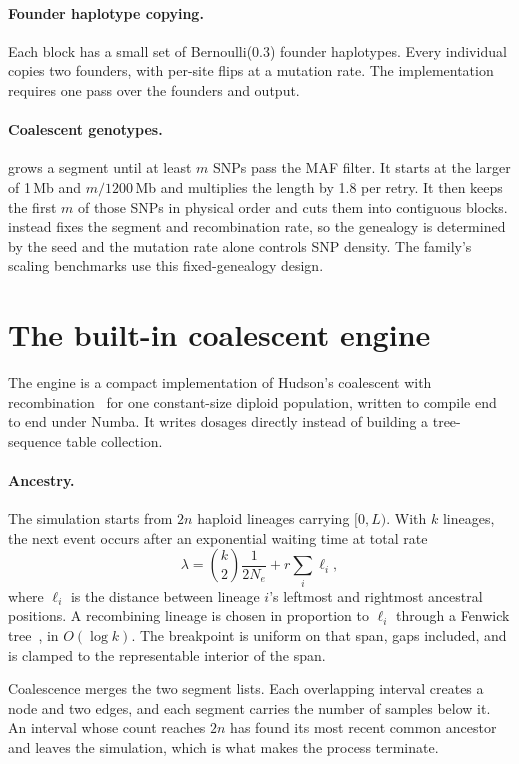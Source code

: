 \documentclass[11pt,a4paper]{article}
\begin{document}
\paragraph{Founder haplotype copying.}
Each block has a small set of Bernoulli(0.3) founder haplotypes. Every
individual copies two founders, with per-site flips at a mutation rate.
The implementation requires one pass over the founders and output.

\paragraph{Coalescent genotypes.}
 grows a segment until at least $m$
SNPs pass the MAF filter. It starts at the larger of 1\,Mb and $m/1200$\,Mb
and multiplies the length by 1.8 per retry. It then keeps the first $m$
of those SNPs in physical order and cuts them into contiguous blocks. 
instead fixes the segment and recombination rate, so the genealogy is
determined by the seed and the mutation rate alone controls SNP density.
The family's scaling benchmarks use this fixed-genealogy design.

\section{The built-in coalescent engine}\label{sec:coal}
The engine is a compact implementation of Hudson's coalescent with
recombination~\cite{hudson1983} for one constant-size diploid population,
written to compile end to end under Numba. It writes dosages directly
instead of building a tree-sequence table collection.

\paragraph{Ancestry.}
The simulation starts from $2n$ haploid lineages carrying $[0,L)$. With
$k$ lineages, the next event occurs after an exponential waiting time at
total rate
\[
\lambda=\binom{k}{2}\frac{1}{2N_e}+r\sum_i\ell_i ,
\]
where $\ell_i$ is the distance between lineage $i$'s leftmost and
rightmost ancestral positions. A recombining lineage is chosen in
proportion to $\ell_i$ through a Fenwick tree~\cite{fenwick1994}, in
$O(\log k)$. The breakpoint is uniform on that span, gaps included, and is
clamped to the representable interior of the span.

Coalescence merges the two segment lists. Each overlapping interval
creates a node and two edges, and each segment carries the number of
samples below it. An interval whose count reaches $2n$ has found its most
recent common ancestor and leaves the simulation, which is what makes the
process terminate.
\end{document}
